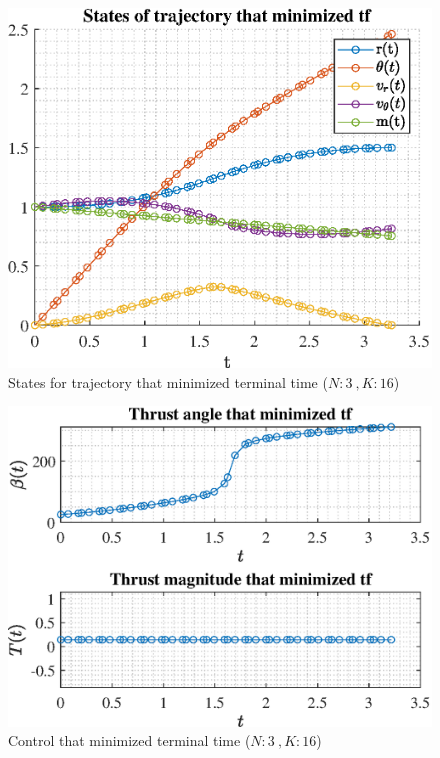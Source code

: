 \documentclass[]{article}
\begin{document}
	\begin{figure}
		\centering
		\includegraphics[scale=0.75]{states_N3_K16_C3_tf.eps}
		\caption{States for trajectory that minimized terminal time (\(N:3\ , K:16\))}
		\label{fig:states_N3_K16_C3_tf}
	\end{figure}
	\begin{figure}
		\centering
		\includegraphics[scale=0.75]{control_N3_K16_C3_tf.eps}
		\caption{Control that minimized terminal time (\(N:3\ , K:16\))}
		\label{fig:control_N3_K16_C3_tf}
	\end{figure}
\end{document}
